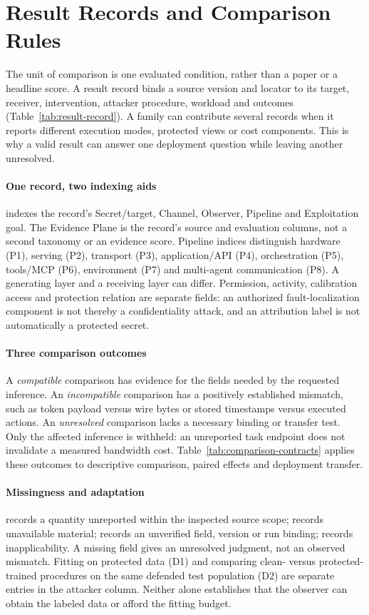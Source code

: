 \section{Result Records and Comparison Rules}\label{sec:scope}
The unit of comparison is one evaluated condition, rather than a paper or a headline score. A result record binds a source version and locator to its target, receiver, intervention, attacker procedure, workload and outcomes (Table~\ref{tab:result-record}). A family can contribute several records when it reports different execution modes, protected views or cost components. This is why a valid result can answer one deployment question while leaving another unresolved.


\paragraph{One record, two indexing aids}
\scope{} indexes the record's Secret/target, Channel, Observer, Pipeline and Exploitation goal. The Evidence Plane is the record's source and evaluation columns, not a second taxonomy or an evidence score. Pipeline indices distinguish hardware (P1), serving (P2), transport (P3), application/API (P4), orchestration (P5), tools/MCP (P6), environment (P7) and multi-agent communication (P8). A generating layer and a receiving layer can differ. Permission, activity, calibration access and protection relation are separate fields: an authorized fault-localization component is not thereby a confidentiality attack, and an attribution label is not automatically a protected secret.

\paragraph{Three comparison outcomes}
A \emph{compatible} comparison has evidence for the fields needed by the requested inference. An \emph{incompatible} comparison has a positively established mismatch, such as token payload versus wire bytes or stored timestamps versus executed actions. An \emph{unresolved} comparison lacks a necessary binding or transfer test. Only the affected inference is withheld: an unreported task endpoint does not invalidate a measured bandwidth cost. Table~\ref{tab:comparison-contracts} applies these outcomes to descriptive comparison, paired effects and deployment transfer.


\paragraph{Missingness and adaptation}
\NRR{} records a quantity unreported within the inspected source scope; \NRA{} records unavailable material; \NRV{} records an unverified field, version or run binding; \NA{} records inapplicability. A missing field gives an unresolved judgment, not an observed mismatch. Fitting on protected data (D1) and comparing clean- versus protected-trained procedures on the same defended test population (D2) are separate entries in the attacker column. Neither alone establishes that the observer can obtain the labeled data or afford the fitting budget.

